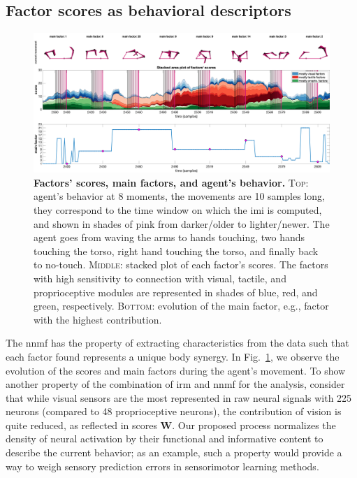 \documentclass[letterpaper, 10 pt, conference]{ieeeconf}  %
\begin{document}
\subsection{Factor scores as behavioral descriptors}
\begin{figure}[h!]
    \centering
    \includegraphics[width=.99\textwidth]{fig/factors_example_time.png}
    \caption{\textbf{Factors' scores, main factors, and agent's behavior.} \textsc{Top}: agent's behavior at 8 moments, the movements are 10 samples long, they correspond to the time window on which the \acl{imi} is computed, and shown in shades of pink from darker/older to lighter/newer. The agent goes from waving the arms to hands touching, two hands touching the torso, right hand touching the torso, and finally back to no-touch. \textsc{Middle}: stacked plot of each factor's scores. The factors with high sensitivity to connection with visual, tactile, and proprioceptive modules are represented in shades of blue, red, and green, respectively. \textsc{Bottom}: evolution of the main factor, e.g., factor with the highest contribution.}
    \label{fig:factors_time}
\end{figure}
The \acl{nnmf} has the property of extracting characteristics from the data such that each factor found represents a unique body synergy. In Fig.~\ref{fig:factors_time}, we observe the evolution of the scores and main factors during the agent's movement. To show another property of the combination of \ac{irm} and \ac{nnmf} for the analysis, consider that while visual sensors are the most represented in raw neural signals with 225 neurons (compared to 48 proprioceptive neurons), the contribution of vision is quite reduced, as reflected in scores $\bm{W}$. Our proposed process normalizes the density of neural activation by their functional and informative content to describe the current behavior; as an example, such a property would provide a way to weigh sensory prediction errors in sensorimotor learning methods.
\end{document}
